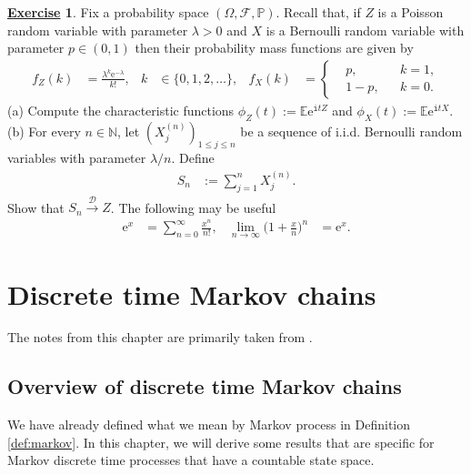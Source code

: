 \documentclass[12pt]{book}
\numberwithin{equation}{chapter}
\theoremstyle{plain}
\numberwithin{theorem}{section}
\theoremstyle{definition}
\newtheorem{exercise}{\underline{Exercise}}
\numberwithin{exercise}{chapter}
\newcommand{\<}{\langle}
\renewcommand{\>}{\rangle}
\renewcommand{\(}{\left(}
\renewcommand{\)}{\right)}
\renewcommand{\[}{\left[}
\renewcommand{\]}{\right]}
\newcommand\Eb{\mathds{E}}
\newcommand\Pb{\mathds{P}}
\newcommand\Nb{\mathds{N}}
\newcommand\Dc{\mathscr{D}}
\newcommand\Fc{\mathscr{F}}
\newcommand\Om{\Omega}
\newcommand\lam{\lambda}
\newcommand\ii{\mathtt{i}}
\newcommand\ee{\mathrm{e}}
\begin{document}
\begin{exercise}
\label{exer:3.10}
Fix a probability space $(\Om,\Fc,\Pb)$.  Recall that, if $Z$ is a Poisson random variable with parameter $\lam>0$ and $X$ is a Bernoulli random variable with parameter $p \in (0,1)$ then their probability mass functions are given by 
\begin{align}
f_Z(k)
	&=	\frac{\lam^k \ee^{-\lam}}{k!} , &
k
	&\in \{0, 1, 2, \ldots \}, &
f_X(k)
	&=	\left\{ \begin{aligned}
			&p , & & k = 1 , \\
			&1 - p , & & k = 0 .
			\end{aligned} \right.
\end{align}
(a) Compute the characteristic functions $\phi_Z(t) := \Eb \ee^{\ii t Z}$ and $\phi_X(t) := \Eb \ee^{\ii t X}$.
\\[0.5em]
(b) For every $n \in \Nb$, let $(X_j^{(n)})_{1 \leq j \leq n}$ be a sequence of i.i.d. Bernoulli random variables with parameter $\lam/n$.
Define 
\begin{align}
S_n 
	&:= \sum_{j=1}^n X_j^{(n)} .
\end{align}
Show that $S_n \stackrel{\Dc}{\to} Z$.  The following may be useful
\begin{align}
\ee^x
	&=	\sum_{n=0}^\infty \frac{x^n}{n!} , &
\lim_{n \to \infty} \Big( 1 + \frac{x}{n} \Big)^n
	&=	\ee^x .
\end{align}
\end{exercise}

%
%

\chapter{Discrete time Markov chains}
\label{chapter:dtmc}
The notes from this chapter are primarily taken from \cite[Chapter 6]{gs2001}.


\section{Overview of discrete time Markov chains}
We have already defined what we mean by Markov process in Definition \ref{def:markov}.  In this chapter, we will derive some results that are specific for Markov discrete time processes that have a countable state space. 
\end{document}
